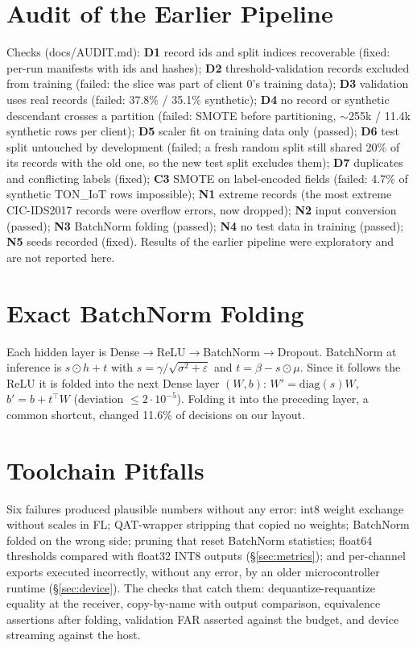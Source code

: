 \documentclass[sigplan,10pt,review,anonymous,nonacm]{acmart}
\newcommand{\cic}{CIC-IDS2017\xspace}
\newcommand{\ton}{TON\_IoT\xspace}
\begin{document}
\FloatBarrier



\appendix
\section{Audit of the Earlier Pipeline}\label{app:audit}
\small
Checks (docs/AUDIT.md): \textbf{D1} record ids and split indices recoverable (fixed: per-run manifests with
ids and hashes); \textbf{D2} threshold-validation records excluded from training (failed: the slice was part
of client 0's training data); \textbf{D3} validation uses real records (failed: 37.8\% / 35.1\% synthetic);
\textbf{D4} no record or synthetic descendant crosses a partition (failed: SMOTE before partitioning,
$\sim$255k / 11.4k synthetic rows per client); \textbf{D5} scaler fit on training data only (passed);
\textbf{D6} test split untouched by development (failed; a fresh random split still shared 20\% of its
records with the old one, so the new test split excludes them); \textbf{D7} duplicates and conflicting
labels (fixed); \textbf{C3} SMOTE on label-encoded fields (failed: 4.7\% of synthetic \ton rows impossible);
\textbf{N1} extreme records (the most extreme \cic records were overflow errors, now dropped);
\textbf{N2} input conversion (passed); \textbf{N3} BatchNorm folding (passed); \textbf{N4} no test data in
training (passed); \textbf{N5} seeds recorded (fixed). Results of the earlier pipeline were exploratory and
are not reported here.

\section{Exact BatchNorm Folding}\label{app:bn}
Each hidden layer is Dense$\rightarrow$ReLU$\rightarrow$BatchNorm$\rightarrow$Dropout. BatchNorm at
inference is $s\odot h+t$ with $s=\gamma/\sqrt{\sigma^2+\varepsilon}$ and $t=\beta-s\odot\mu$. Since it
follows the ReLU it is folded into the next Dense layer $(W,b)$: $W'=\mathrm{diag}(s)W$, $b'=b+t^{\top}W$
(deviation $\le2\cdot10^{-5}$). Folding it into the preceding layer, a common shortcut, changed 11.6\% of
decisions on our layout.

\section{Toolchain Pitfalls}\label{app:pitfalls}
Six failures produced plausible numbers without any error: int8 weight exchange without scales in FL;
QAT-wrapper stripping that copied no weights; BatchNorm folded on the wrong side; pruning that reset
BatchNorm statistics; float64 thresholds compared with float32 INT8 outputs (\S\ref{sec:metrics}); and
per-channel exports executed incorrectly, without any error, by an older microcontroller runtime (\S\ref{sec:device}). The checks that
catch them: dequantize-requantize equality at the receiver, copy-by-name with output comparison,
equivalence assertions after folding, validation FAR asserted against the budget, and device streaming
against the host.
\end{document}
